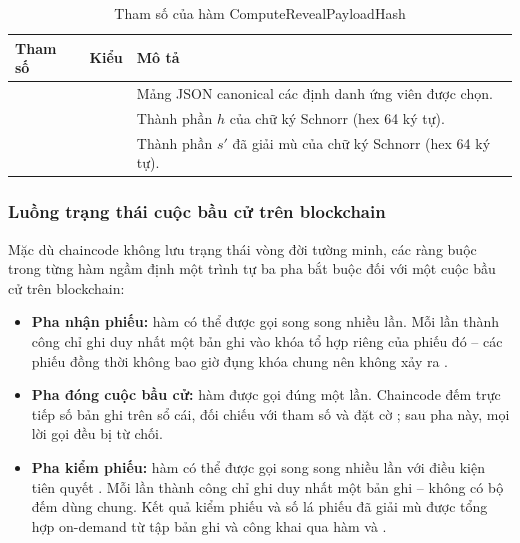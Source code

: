 \begin{table}[H]
    \centering
    \small
    \setlength{\tabcolsep}{3pt}
    \caption{Tham số của hàm ComputeRevealPayloadHash}
    \label{tab:cc-computerevealpayloadhash}
    \begin{tabularx}{\textwidth}{|L{0.25}|L{0.25}|L{0.50}|}
    \hline
    \textbf{Tham số} & \textbf{Kiểu} & \textbf{Mô tả} \\
    \hline
     &  & Mảng JSON canonical các định danh ứng viên được chọn. \\ \hline
               &  & Thành phần $h$ của chữ ký Schnorr (hex 64 ký tự). \\ \hline
          &  & Thành phần $s'$ đã giải mù của chữ ký Schnorr (hex 64 ký tự). \\ \hline
    \end{tabularx}
\end{table}

\subsubsection{Luồng trạng thái cuộc bầu cử trên blockchain}

Mặc dù chaincode không lưu trạng thái vòng đời tường minh, các ràng buộc trong từng hàm ngầm định một trình tự ba pha bắt buộc đối với một cuộc bầu cử trên blockchain:

\begin{itemize}
    \item \textbf{Pha nhận phiếu:} hàm  có thể được gọi song song nhiều lần. Mỗi lần thành công chỉ ghi duy nhất một bản ghi  vào khóa tổ hợp riêng của phiếu đó -- các phiếu đồng thời không bao giờ đụng khóa chung nên không xảy ra .
    \item \textbf{Pha đóng cuộc bầu cử:} hàm  được gọi đúng một lần. Chaincode đếm trực tiếp số bản ghi  trên sổ cái, đối chiếu với tham số  và đặt cờ ; sau pha này, mọi lời gọi  đều bị từ chối.
    \item \textbf{Pha kiểm phiếu:} hàm  có thể được gọi song song nhiều lần với điều kiện tiên quyết . Mỗi lần thành công chỉ ghi duy nhất một bản ghi  -- không có bộ đếm dùng chung. Kết quả kiểm phiếu và số lá phiếu đã giải mù được tổng hợp on-demand từ tập bản ghi  và công khai qua hàm  và .
\end{itemize}

